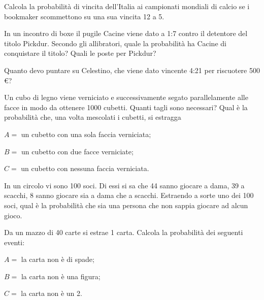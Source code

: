 \begin{esercizio}[\Ast]
 \label{ese:9.40}
Calcola la probabilità di vincita dell'Italia ai campionati mondiali di calcio se i bookmaker scommettono su una sua vincita 12 a 5.
\end{esercizio}

\begin{esercizio}[\Ast]
 \label{ese:9.41}
In un incontro di boxe il pugile Cacine viene dato a 1:7 contro il detentore del titolo Pickdur.
Secondo gli allibratori, quale la probabilità ha Cacine di conquistare il titolo?
Quali le poste per Pickdur?
\end{esercizio}

\begin{esercizio}[\Ast]
 \label{ese:9.42}
Quanto devo puntare su Celestino, che viene dato vincente 4:21 per riscuotere 500 €?
\end{esercizio}

\begin{esercizio}[\Ast]
 \label{ese:9.43}
Un cubo di legno viene verniciato e successivamente segato parallelamente alle facce in modo da ottenere 1000 cubetti. Quanti tagli sono necessari? Qual è la probabilità che, una volta mescolati i cubetti, si estragga
\begin{itemize*}
\item $ A= $ un cubetto con una sola faccia verniciata;
\item $ B= $ un cubetto con due facce verniciate;
\item $ C= $ un cubetto con nessuna faccia verniciata.
\end{itemize*}
\end{esercizio}

\begin{esercizio}[\Ast]
 \label{ese:9.44}
In un circolo vi sono 100 soci. Di essi si sa che 44 sanno giocare a dama, 39 a scacchi, 8 sanno giocare sia a dama che a scacchi. Estraendo a sorte uno dei 100 soci, qual è la probabilità che sia una persona che non sappia giocare ad alcun gioco.
\end{esercizio}

\begin{esercizio}[\Ast]
 \label{ese:9.45}
Da un mazzo di 40 carte si estrae 1 carta. Calcola la probabilità dei seguenti eventi:
\begin{itemize*}
\item $ A= $ la carta non è di spade;
\item $ B= $ la carta non è una figura;
\item $ C= $ la carta non è un 2.
\end{itemize*}
\end{esercizio}

